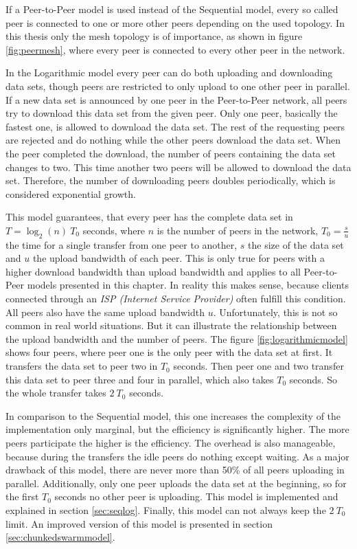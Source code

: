 If a Peer-to-Peer model is used instead of the Sequential model, every so called peer is connected to one or more other peers depending on the used topology. In this thesis only the mesh topology is of importance, as shown in figure \ref{fig:peermesh}, where every peer is connected to every other peer in the network.

In the Logarithmic model every peer can do both uploading and downloading data sets, though peers are restricted to only upload to one other peer in parallel. If a new data set is announced by one peer in the Peer-to-Peer network, all peers try to download this data set from the given peer. Only one peer, basically the fastest one, is allowed to download the data set. The rest of the requesting peers are rejected and do nothing while the other peers download the data set. When the peer completed the download, the number of peers containing the data set changes to two. This time another two peers will be allowed to download the data set. Therefore, the number of downloading peers doubles periodically, which is considered exponential growth.

This model guarantees, that every peer has the complete data set in $T=\log_{2}{(n)}\:T_0$  seconds, where $n$ is the number of peers in the network, $T_0=\frac{s}{u}$ the time for a single transfer from one peer to another, $s$ the size of the data set and $u$ the upload bandwidth of each peer. This is only true for peers with a higher download bandwidth than upload bandwidth and applies to all Peer-to-Peer models presented in this chapter. In reality this makes sense, because clients connected through an \emph{ISP (Internet Service Provider)} often fulfill this condition. All peers also have the same upload bandwidth $u$. Unfortunately, this is not so common in real world situations. But it can illustrate the relationship between the upload bandwidth and the number of peers. The figure \ref{fig:logarithmicmodel} shows four peers, where peer one is the only peer with the data set at first. It transfers the data set to peer two in $T_0$ seconds. Then peer one and two transfer this data set to peer three and four in parallel, which also takes $T_0$ seconds. So the whole transfer takes $2\:T_0$ seconds.

In comparison to the Sequential model, this one increases the complexity of the implementation only marginal, but the efficiency is significantly higher. The more peers participate the higher is the efficiency. The overhead is also manageable, because during the transfers the idle peers do nothing except waiting. As a major drawback of this model, there are never more than 50\% of all peers uploading in parallel. Additionally, only one peer uploads the data set at the beginning, so for the first $T_0$ seconds no other peer is uploading. This model is implemented and explained in section \ref{sec:seqlog}. Finally, this model can not always keep the $2\:T_0$ limit. An improved version of this model is presented in section \ref{sec:chunkedswarmmodel}.

